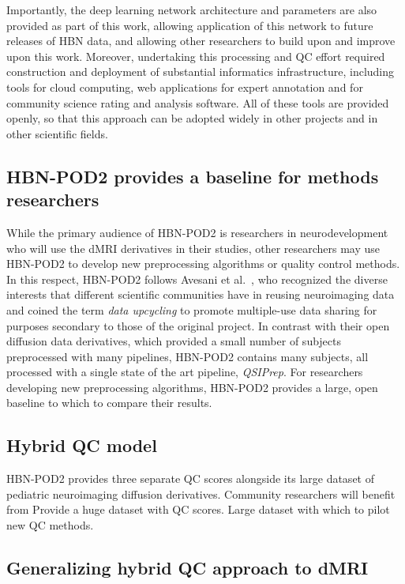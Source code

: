 \documentclass[fleqn,10pt]{wlscirep}
\begin{document}
Importantly, the deep learning network architecture and parameters are also
provided as part of this work, allowing application of this network to future
releases of HBN data, and allowing other researchers to build upon and improve
upon this work. Moreover, undertaking this processing and QC effort required
construction and deployment of substantial informatics infrastructure, including
tools for cloud computing, web applications for expert annotation and for
community science rating and analysis software. All of these tools are provided
openly, so that this approach can be adopted widely in other projects and in
other scientific fields.

\subsection*{HBN-POD2 provides a baseline for methods researchers}

While the primary audience of HBN-POD2 is researchers in neurodevelopment who
will use the dMRI derivatives in their studies, other researchers may use
HBN-POD2 to develop new preprocessing algorithms or quality control methods. In
this respect, HBN-POD2 follows Avesani et al.~\cite{avesani2019-ey}, who
recognized the diverse interests that different scientific communities have in
reusing neuroimaging data and coined the term \emph{data upcycling} to promote
multiple-use data sharing for purposes secondary to those of the original
project. In contrast with their open diffusion data derivatives, which provided
a small number of subjects preprocessed with many pipelines, HBN-POD2 contains
many subjects, all processed with a single state of the art pipeline,
\emph{QSIPrep}. For researchers developing new preprocessing algorithms,
HBN-POD2 provides a large, open baseline to which to compare their results.

\subsection*{Hybrid QC model}

HBN-POD2 provides three separate QC scores alongside its large dataset of
pediatric neuroimaging diffusion derivatives. Community researchers will
benefit from
Provide a huge dataset with QC
scores. Large dataset with which to pilot new QC methods.

\subsection*{Generalizing hybrid QC approach to dMRI}
\end{document}
